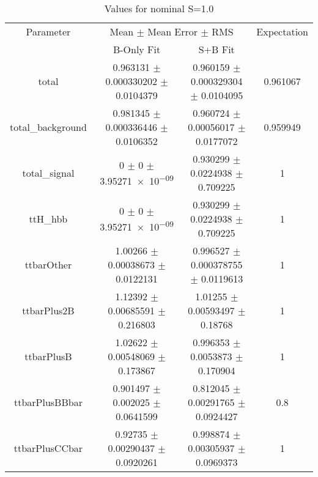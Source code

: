 \begin{table}
\centering
\caption{Values for nominal S=1.0}
\begin{tabular}{cccc}
\toprule
Parameter & \multicolumn{2}{c}{Mean $\pm$ Mean Error $\pm$ RMS} & Expectation\\
 & B-Only Fit & S+B Fit & \\
\midrule
total & \num{0.963131} $\pm$ \num{0.000330202} $\pm$ \num{0.0104379} & \num{0.960159} $\pm$ \num{0.000329304} $\pm$ \num{0.0104095} & \num{0.961067}\\
total\_background & \num{0.981345} $\pm$ \num{0.000336446} $\pm$ \num{0.0106352} & \num{0.960724} $\pm$ \num{0.00056017} $\pm$ \num{0.0177072} & \num{0.959949}\\
total\_signal & \num{0} $\pm$ \num{0} $\pm$ \num{3.95271e-09} & \num{0.930299} $\pm$ \num{0.0224938} $\pm$ \num{0.709225} & \num{1}\\
ttH\_hbb & \num{0} $\pm$ \num{0} $\pm$ \num{3.95271e-09} & \num{0.930299} $\pm$ \num{0.0224938} $\pm$ \num{0.709225} & \num{1}\\
ttbarOther & \num{1.00266} $\pm$ \num{0.00038673} $\pm$ \num{0.0122131} & \num{0.996527} $\pm$ \num{0.000378755} $\pm$ \num{0.0119613} & \num{1}\\
ttbarPlus2B & \num{1.12392} $\pm$ \num{0.00685591} $\pm$ \num{0.216803} & \num{1.01255} $\pm$ \num{0.00593497} $\pm$ \num{0.18768} & \num{1}\\
ttbarPlusB & \num{1.02622} $\pm$ \num{0.00548069} $\pm$ \num{0.173867} & \num{0.996353} $\pm$ \num{0.0053873} $\pm$ \num{0.170904} & \num{1}\\
ttbarPlusBBbar & \num{0.901497} $\pm$ \num{0.002025} $\pm$ \num{0.0641599} & \num{0.812045} $\pm$ \num{0.00291765} $\pm$ \num{0.0924427} & \num{0.8}\\
ttbarPlusCCbar & \num{0.92735} $\pm$ \num{0.00290437} $\pm$ \num{0.0920261} & \num{0.998874} $\pm$ \num{0.00305937} $\pm$ \num{0.0969373} & \num{1}\\
\bottomrule
\end{tabular}
\end{table}